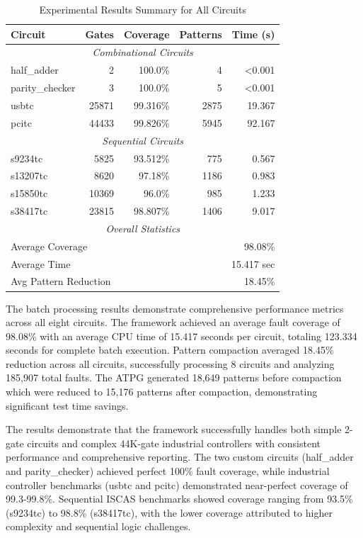\documentclass[conference]{IEEEtran}
\begin{document}
\begin{table}[htbp]
\caption{Experimental Results Summary for All Circuits}
\begin{center}
\begin{tabular}{|l|r|r|r|r|}
\hline
\textbf{Circuit} & \textbf{Gates} & \textbf{Coverage} & \textbf{Patterns} & \textbf{Time (s)} \\
\hline
\multicolumn{5}{|c|}{\textit{Combinational Circuits}} \\
\hline
half\_adder & 2 & 100.0\% & 4 & <0.001 \\
parity\_checker & 3 & 100.0\% & 5 & <0.001 \\
usbtc & 25871 & 99.316\% & 2875 & 19.367 \\
pcitc & 44433 & 99.826\% & 5945 & 92.167 \\
\hline
\multicolumn{5}{|c|}{\textit{Sequential Circuits}} \\
\hline
s9234tc & 5825 & 93.512\% & 775 & 0.567 \\
s13207tc & 8620 & 97.18\% & 1186 & 0.983 \\
s15850tc & 10369 & 96.0\% & 985 & 1.233 \\
s38417tc & 23815 & 98.807\% & 1406 & 9.017 \\
\hline
\multicolumn{5}{|c|}{\textit{Overall Statistics}} \\
\hline
\multicolumn{2}{|l|}{Average Coverage} & \multicolumn{3}{r|}{98.08\%} \\
\multicolumn{2}{|l|}{Average Time} & \multicolumn{3}{r|}{15.417 sec} \\
\multicolumn{2}{|l|}{Avg Pattern Reduction} & \multicolumn{3}{r|}{18.45\%} \\
\hline
\end{tabular}
\label{tab:results}
\end{center}
\end{table}

The batch processing results demonstrate comprehensive performance metrics across all eight circuits. The framework achieved an average fault coverage of 98.08\% with an average CPU time of 15.417 seconds per circuit, totaling 123.334 seconds for complete batch execution. Pattern compaction averaged 18.45\% reduction across all circuits, successfully processing 8 circuits and analyzing 185,907 total faults. The ATPG generated 18,649 patterns before compaction which were reduced to 15,176 patterns after compaction, demonstrating significant test time savings.

The results demonstrate that the framework successfully handles both simple 2-gate circuits and complex 44K-gate industrial controllers with consistent performance and comprehensive reporting. The two custom circuits (half\_adder and parity\_checker) achieved perfect 100\% fault coverage, while industrial controller benchmarks (usbtc and pcitc) demonstrated near-perfect coverage of 99.3-99.8\%. Sequential ISCAS benchmarks showed coverage ranging from 93.5\% (s9234tc) to 98.8\% (s38417tc), with the lower coverage attributed to higher complexity and sequential logic challenges.
\end{document}
